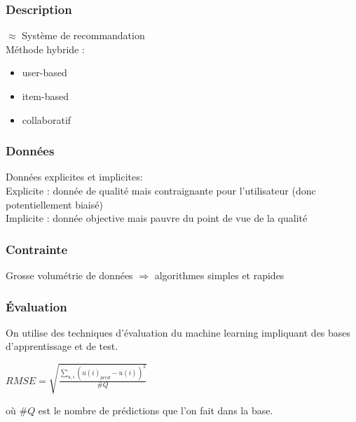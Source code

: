 \begin{frame}
  \frametitle{Description}
  $\approx$ Système de recommandation \\
  \newline
  Méthode hybride :
  \begin{itemize}
  \item user-based
  \item item-based
  \item collaboratif
  \end{itemize}
\end{frame}

\begin{frame}
  \frametitle{Données}
  Données explicites et implicites:\\
  Explicite : donnée de qualité mais contraignante pour l'utilisateur (donc potentiellement biaisé)\\
  Implicite : donnée objective mais pauvre du point de vue de la qualité  
\end{frame}

\begin{frame}
  \frametitle{Contrainte}
  Grosse volumétrie de données $\Rightarrow$ algorithmes simples et rapides 
\end{frame}

\begin{frame}
  \frametitle{Évaluation}
  On utilise des techniques d'évaluation du machine learning impliquant des bases d'apprentissage et de test.
  \begin{center}
    $RMSE = \sqrt{\frac{\sum_{u,i}(u(i)_{pred}-u(i))^2}{\#Q}}$
  \end{center}
  où $\#Q$ est le nombre de prédictions que l'on fait dans la base.
\end{frame}


